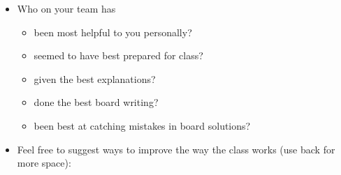 \documentclass[handout]{mcs}
\begin{document}
\begin{itemize}
\item Who on your team has
  \begin{itemize}
    \item been most helpful to you personally?\hfill\brule{2in}
    \item seemed to have best prepared for class?\hfill\brule{2in}
    \item given the best explanations?\hfill\brule{2in}
    \item done the best board writing?\hfill\brule{2in}
    \item been best at catching mistakes in board solutions?\hfill\brule{2in}
  \end{itemize}
\iffalse

\item Would you like the staff (Meyer/TA/LA) to present solutions to
  selected problems in class after your team has finished working on
  them?

\begin{center}
Never \hspace{0.7in} Rarely \hspace{0.7in} Sometimes \hspace{0.7in}
Regularly \hspace{0.7in} Always
\end{center}
\fi

\item Feel free to suggest ways to improve the way the class works
  (use back for more space):
\vspace{1in}


\end{itemize}
\end{document}
